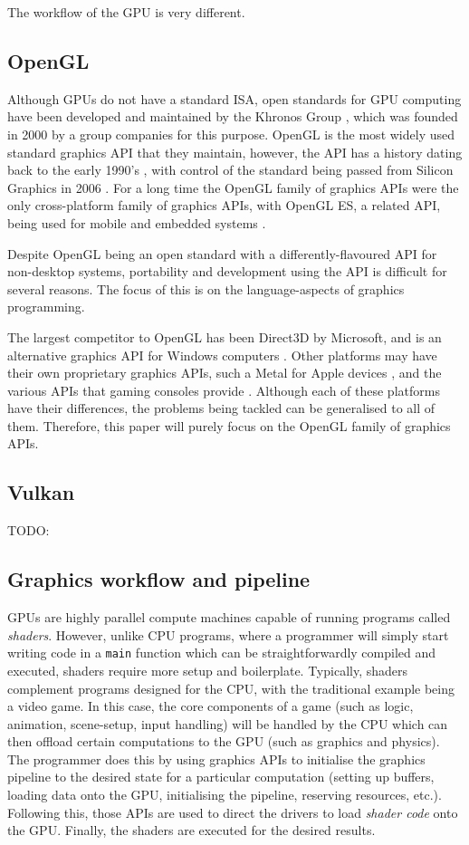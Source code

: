 \documentclass[a4paper,12pt,twoside,openright]{report}
\begin{document}
The workflow of the GPU is very different.

\subsection{OpenGL}

Although GPUs do not have a standard ISA, open standards for GPU computing have
been developed and maintained by the Khronos Group \cite{TODO}, which was
founded in 2000 by a group companies for this purpose. OpenGL is the most
widely used standard graphics API that they maintain, however, the API has a
history dating back to the early 1990's \cite{TODO}, with control of the
standard being passed from Silicon Graphics in 2006 \cite{TODO}. For a long
time the OpenGL family of graphics APIs were the only cross-platform family of
graphics APIs, with OpenGL ES, a related API, being used for mobile and
embedded systems \cite{TODO}.

Despite OpenGL being an open standard with a differently-flavoured API for
non-desktop systems, portability and development using the API is difficult for
several reasons. The focus of this is on the language-aspects of graphics
programming.

The largest competitor to OpenGL has been Direct3D by Microsoft, and is an
alternative graphics API for Windows computers \cite{TODO}. Other platforms may
have their own proprietary graphics APIs, such a Metal for Apple devices
\cite{TODO}, and the various APIs that gaming consoles provide \cite{TODO}.
Although each of these platforms have their differences, the problems being
tackled can be generalised to all of them. Therefore, this paper will purely
focus on the OpenGL family of graphics APIs.

\subsection{Vulkan}

TODO:

\subsection{Graphics workflow and pipeline}

GPUs are highly parallel compute machines capable of running programs called
\textit{shaders}. However, unlike CPU programs, where a programmer will simply
start writing code in a \texttt{main} function which can be straightforwardly
compiled and executed, shaders require more setup and boilerplate. Typically,
shaders complement programs designed for the CPU, with the traditional example
being a video game. In this case, the core components of a game (such as logic,
animation, scene-setup, input handling) will be handled by the CPU which can
then offload certain computations to the GPU (such as graphics and physics).
The programmer does this by using graphics APIs to initialise the graphics
pipeline to the desired state for a particular computation (setting up buffers,
loading data onto the GPU, initialising the pipeline, reserving resources,
etc.). Following this, those APIs are used to direct the drivers to load
\textit{shader code} onto the GPU. Finally, the shaders are executed for the
desired results.
\end{document}
